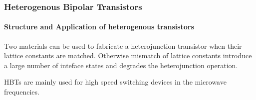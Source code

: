 \begin{frame}
  \frametitle{Heterogenous Bipolar Transistors}
  \framesubtitle{Structure and Application of heterogenous transistors}
  Two materials can be used to fabricate a heterojunction transistor when their lattice constants are matched. Otherwise mismatch of lattice constants introduce a large number of inteface states and degrades the heterojunction operation.

  HBTs are mainly used for high speed switching devices in the microwave frequencies.
\end{frame}